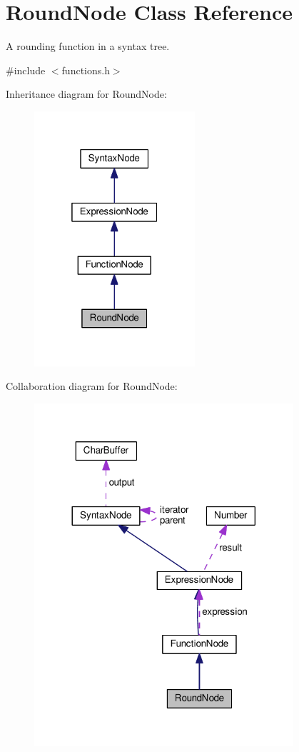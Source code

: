 \hypertarget{classRoundNode}{}\section{Round\+Node Class Reference}
\label{classRoundNode}


A rounding function in a syntax tree.  




{\ttfamily \#include $<$functions.\+h$>$}



Inheritance diagram for Round\+Node\+:\nopagebreak
\begin{figure}[H]
\begin{center}
\leavevmode
\includegraphics[width=169pt]{classRoundNode__inherit__graph}
\end{center}
\end{figure}


Collaboration diagram for Round\+Node\+:\nopagebreak
\begin{figure}[H]
\begin{center}
\leavevmode
\includegraphics[width=272pt]{classRoundNode__coll__graph}
\end{center}
\end{figure}
